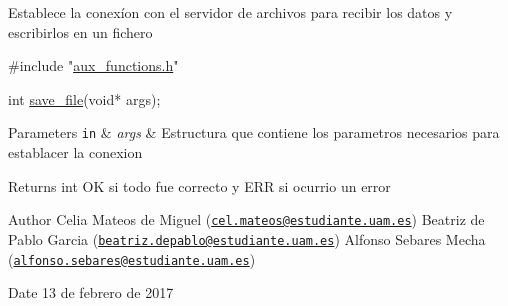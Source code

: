Establece la conexíon con el servidor de archivos para recibir los datos y escribirlos en un fichero


\begin{DoxyCode}
\textcolor{preprocessor}{#include "\hyperlink{aux__functions_8h}{aux\_functions.h}"}

\textcolor{keywordtype}{int} \hyperlink{aux__functions_8h_a9a7f9a514711f5954007dc83533d9362}{save\_file}(\textcolor{keywordtype}{void}* args);
\end{DoxyCode}



\begin{DoxyParams}[1]{Parameters}
\mbox{\tt in}  & {\em args} & Estructura que contiene los parametros necesarios para establacer la conexion\\
\hline
\end{DoxyParams}
\begin{DoxyReturn}{Returns}
int O\-K si todo fue correcto y E\-R\-R si ocurrio un error
\end{DoxyReturn}
\begin{DoxyAuthor}{Author}
Celia Mateos de Miguel (\href{mailto:cel.mateos@estudiante.uam.es}{\tt cel.\-mateos@estudiante.\-uam.\-es}) Beatriz de Pablo Garcia (\href{mailto:beatriz.depablo@estudiante.uam.es}{\tt beatriz.\-depablo@estudiante.\-uam.\-es}) Alfonso Sebares Mecha (\href{mailto:alfonso.sebares@estudiante.uam.es}{\tt alfonso.\-sebares@estudiante.\-uam.\-es})
\end{DoxyAuthor}
\begin{DoxyDate}{Date}
13 de febrero de 2017
\end{DoxyDate}


 